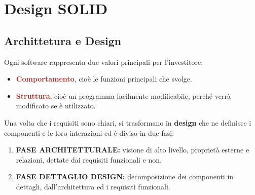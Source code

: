 \chapter{Design SOLID}
\section{Archittetura e Design}
Ogni software rappresenta due valori principali per l'investitore:
\begin{itemize}
    \item \textbf{\textcolor{brown}{Comportamento}}, cioè le funzioni principali che svolge.
    \item \textbf{\textcolor{brown}{Struttura}}, cioè un programma facilmente modificabile, perché verrà modificato se è utilizzato.
\end{itemize}

Una volta che i requisiti sono chiari, si trasformano in \textbf{design} che ne definisce i componenti e le loro interazioni ed è diviso in due fasi:
\begin{enumerate}
    \item \textbf{FASE ARCHITETTURALE:} visione di alto livello, proprietà esterne e relazioni, dettate dai requisiti funzionali e non.
    \item \textbf{FASE DETTAGLIO DESIGN:} decomposizione dei componenti in dettagli, dall'architettura ed i requisiti funzionali.
\end{enumerate}

